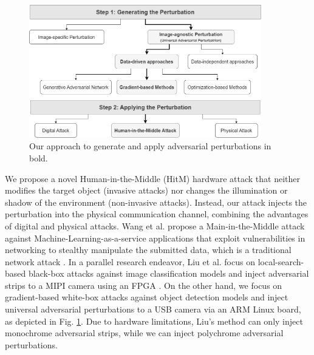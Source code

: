 

\begin{figure}[bt]
    \centering
    \includegraphics[width=0.9\textwidth]{figures/chapter_detection/hardware/attack.jpg}
    \caption{Our approach to generate and apply adversarial perturbations in bold.}
    \label{fig:attack}
\end{figure}

We propose a novel Human-in-the-Middle (HitM)  hardware attack that neither modifies the target object (invasive attacks) nor changes the illumination or shadow of the environment (non-invasive attacks). Instead, our attack injects the perturbation into the physical communication channel, combining the advantages of digital and physical attacks. Wang et al. propose a Main-in-the-Middle attack against Machine-Learning-as-a-service applications that exploit vulnerabilities in networking to stealthy manipulate the submitted data, which is a traditional network attack \citep{wang2020man}. In a parallel research endeavor, Liu et al. focus on local-search-based black-box attacks against image classification models and inject adversarial strips to a MIPI camera using an FPGA \citep{liu2022practical}. On the other hand, we focus on gradient-based white-box attacks against object detection models and inject universal adversarial perturbations to a USB camera via an ARM Linux board, as depicted in Fig. \ref{fig:attack}. Due to hardware limitations, Liu's method can only inject monochrome adversarial strips, while we can inject polychrome adversarial perturbations. 


